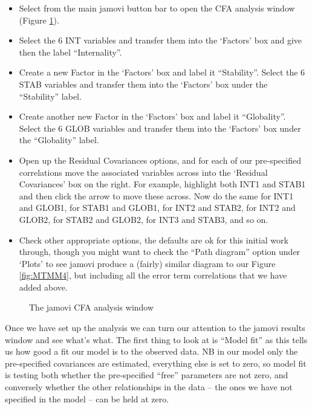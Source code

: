\begin{itemize} \itemsep -2pt

\item Select  from the main jamovi button bar to open the CFA analysis window (Figure \ref{fig:MTMM5}).
\item Select the 6 INT variables and transfer them into the ‘Factors’ box and give then the label “Internality”.
\item Create a new Factor in the ‘Factors’ box and label it “Stability”. Select the 6 STAB variables and transfer them into the ‘Factors’ box under the “Stability” label. 
\item Create another new Factor in the ‘Factors’ box and label it “Globality”. Select the 6 GLOB variables and transfer them into the ‘Factors’ box under the “Globality” label.
\item Open up the Residual Covariances options, and for each of our pre-specified correlations move the associated variables across into the ‘Residual Covariances’ box on the right. For example, highlight both INT1 and STAB1 and then click the arrow to move these across. Now do the same for INT1 and GLOB1, for STAB1 and GLOB1, for INT2 and STAB2, for INT2 and GLOB2, for STAB2 and GLOB2, for INT3 and STAB3, and so on.
\item Check other appropriate options, the defaults are ok for this initial work through, though you might want to check the “Path diagram” option under ‘Plots’ to see jamovi produce a (fairly) similar diagram to our Figure \ref{fig:MTMM4}, but including all the error term correlations that we have added above.
\end{itemize} 

\begin{figure}[p]
\begin{center}
\caption{The jamovi CFA analysis window}
\label{fig:MTMM5}
\HR
\end{center}
\end{figure}

Once we have set up the analysis we can turn our attention to the jamovi results window and see what’s what. The first thing to look at is “Model fit” as this tells us how good a fit our model is to the observed data. NB in our model only the pre-specified covariances are estimated, everything else is set to zero, so model fit is testing both whether the pre-specified “free” parameters are not zero, and conversely whether the other relationships in the data – the ones we have not specified in the model – can be held at zero.

